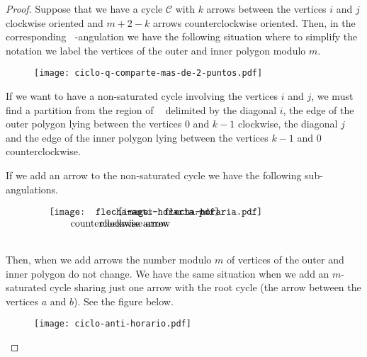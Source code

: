 \documentclass{amsart}
\theoremstyle{plain}
\theoremstyle{definition}
\begin{document}
\begin{proof}
Suppose that we have a  cycle $\mathcal{C}$ with  $k$ arrows  between the vertices  $i$ and $j$ clockwise oriented and  $m+2-k$ arrows counterclockwise oriented. Then, in the corresponding ${\mathop{(m+2)}\nolimits}$-angulation we have the following situation where to simplify the  notation we label the vertices of the outer and inner polygon modulo $m$.

\begin{figure}[H]
\begin{center}
\texttt{[image: ciclo-q-comparte-mas-de-2-puntos.pdf]}
\end{center}
\end{figure}

If we want to have a non-saturated  cycle involving the vertices $i$ and $j$, we must find a  partition from the region of  ${\mathop{P_{p,q,m}}\nolimits}$ delimited by the  diagonal $i$, the edge of the outer polygon  lying between the vertices  $0$ and $k-1$ clockwise, the diagonal $j$ and the edge of the inner polygon   lying between the vertices  $k-1$ and $0$ counterclockwise.

If we  add an arrow to the non-saturated cycle we have the following  sub-angulations.

 $$ \begin{array}{cc}
    \hspace*{-2cm} \texttt{[image: flecha-anti-horaria.pdf]} & \hspace*{-4cm}\texttt{[image: flecha-horaria.pdf]} \\
   \hspace*{-3cm} \text{counterclockwise arrow}  & \hspace*{-8cm} \text{clockwise arrow}  \\
    &\\

  \end{array}$$

Then, when we add arrows the number modulo $m$  of vertices of the outer and inner polygon  do not change. We have the same situation when we add an  $m$-saturated cycle sharing just one arrow with the root cycle (the arrow between the vertices $a$ and $b$). See the figure below.

 \begin{figure}[H]
 \begin{center}
 \texttt{[image: ciclo-anti-horario.pdf]}
   
    \end{center}
  \end{figure}


\end{proof}
\end{document}
